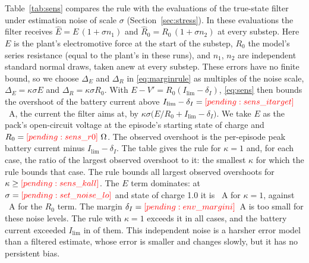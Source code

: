 \begin{remark}
Table~\ref{tab:sens} compares the rule with the evaluations of the true-state filter under estimation noise of scale $\sigma$ (Section~\ref{sec:stress}). In these evaluations the filter receives $\hat E = E\,(1+\sigma n_1)$ and $\hat R_0 = R_0\,(1+\sigma n_2)$ at every substep. Here $E$ is the plant's electromotive force at the start of the substep, $R_0$ the model's series resistance (equal to the plant's in these runs), and $n_1$, $n_2$ are independent standard normal draws, taken anew at every substep. These errors have no finite bound, so we choose $\Delta_E$ and $\Delta_R$ in \eqref{eq:marginrule} as multiples of the noise scale, $\Delta_E = \kappa\sigma E$ and $\Delta_R = \kappa\sigma R_0$. With $E-V' = R_0(I_{\lim}-\delta_I)$, \eqref{eq:sens} then bounds the overshoot of the battery current above $I_{\lim}-\delta_I=\res{sens_itarget}$~A, the current the filter aims at, by $\kappa\sigma\bigl(E/R_0 + I_{\lim}-\delta_I\bigr)$. We take $E$ as the pack's open-circuit voltage at the episode's starting state of charge and $R_0=\res{sens_r0}~\Omega$. The observed overshoot is the per-episode peak battery current minus $I_{\lim}-\delta_I$. The table gives the rule for $\kappa=1$ and, for each case, the ratio of the largest observed overshoot to it: the smallest $\kappa$ for which the rule bounds that case. The rule bounds all  largest observed overshoots for $\kappa \ge \res{sens_kall}$. The $E$ term dominates: at $\sigma=\res{set_noise_lo}$ and state of charge 1.0 it is ~A for $\kappa=1$, against ~A for the $R_0$ term. The margin $\delta_I=\res{env_margini}$~A is too small for these noise levels. The rule with $\kappa=1$ exceeds it in all  cases, and the battery current exceeded $I_{\lim}$ in  of them. This independent noise is a harsher error model than a filtered estimate, whose error is smaller and changes slowly, but it has no persistent bias.
\end{remark}
\begin{table}[tbp]\centering\caption{Current-barrier sensitivity rule \eqref{eq:sens} with error bounds equal to the noise scale ($\kappa=1$), against the observed overshoot of the battery current above $I_{\lim}-\delta_I$. Warm-started filter policies in filter mode, true-state filter with estimation noise $\sigma$,  seeds $\times$  episodes per state of charge. Overshoot: mean $\pm$ std over seeds of the per-episode peak; largest: over all episodes; $\kappa$ needed: largest overshoot divided by the rule for $\kappa=1$.}\label{tab:sens}
\end{table}

